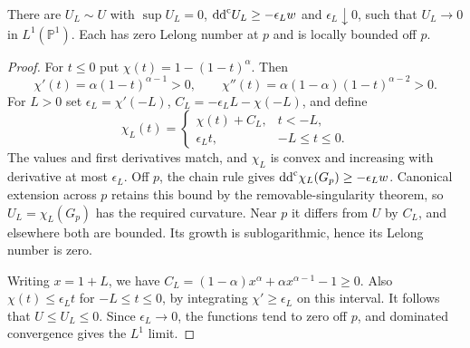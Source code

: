 \begin{lemma}\label{lem:ruled-sublog-small-curvature}
There are $U_L\sim U$ with $\sup U_L=0$, $\mathrm{dd}^{\mathrm{c}} U_L\geq-\epsilon_Lw$ and $\epsilon_L\downarrow0$, such that $U_L\to0$ in $L^1(\mathbb P^1)$. Each has zero Lelong number at $p$ and is locally bounded off $p$.
\end{lemma}
\begin{proof}
For $t\leq0$ put $\chi(t)=1-(1-t)^\alpha$. Then
\[
 \chi'(t)=\alpha(1-t)^{\alpha-1}>0,\qquad
 \chi''(t)=\alpha(1-\alpha)(1-t)^{\alpha-2}>0.
\]
For $L>0$ set $\epsilon_L=\chi'(-L)$, $C_L=-\epsilon_LL-\chi(-L)$, and define
\[
 \chi_L(t)=
 \begin{cases}
  \chi(t)+C_L,&t<-L,\\
  \epsilon_Lt,&-L\leq t\leq0.
 \end{cases}
\]
The values and first derivatives match, and $\chi_L$ is convex and increasing with derivative at most $\epsilon_L$. Off $p$, the chain rule gives $\mathrm{dd}^{\mathrm{c}}\chi_L(G_p)\geq-\epsilon_Lw$. Canonical extension across $p$ retains this bound by the removable-singularity theorem, so $U_L=\chi_L(G_p)$ has the required curvature. Near $p$ it differs from $U$ by $C_L$, and elsewhere both are bounded. Its growth is sublogarithmic, hence its Lelong number is zero.

Writing $x=1+L$, we have $C_L=(1-\alpha)x^\alpha+\alpha x^{\alpha-1}-1\geq0$. Also $\chi(t)\leq\epsilon_Lt$ for $-L\leq t\leq0$, by integrating $\chi'\geq\epsilon_L$ on this interval. It follows that $U\leq U_L\leq0$. Since $\epsilon_L\to0$, the functions tend to zero off $p$, and dominated convergence gives the $L^1$ limit.
\end{proof}

